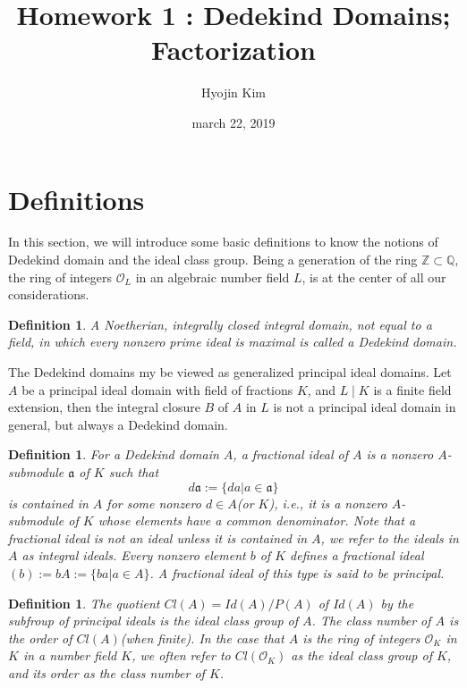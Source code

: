 \documentclass[11pt,a4paper,reqno]{amsart}
\numberwithin{equation}{section}
\newtheorem{defn}[thm]{Definition}
\begin{document}
 


\title{Homework 1 : Dedekind Domains; Factorization} 
\author{Hyojin Kim} 
\date{march 22, 2019} 
\maketitle 

\section{Definitions} 

In this section, we will introduce some basic definitions to know the notions of Dedekind domain and the ideal class group. 
Being a generation of the ring $\mathbb{Z} \subset \mathbb{Q}$, the ring of integers $\mathcal{O}_L$ in an algebraic number field $L$, is at the center of all our considerations.

\begin{defn}
A Noetherian, integrally closed integral domain, not equal to a field, in which every nonzero prime ideal is maximal is called a Dedekind domain.
\end{defn}

The Dedekind domains my be viewed as generalized principal ideal domains. 
Let $A$ be a principal ideal domain with field of fractions $K$, and $L \mid K$ is a finite field extension, 
then the integral closure $B$ of $A$ in $L$ is not a principal ideal domain in general,
but always a Dedekind domain.

\begin{defn}
For a Dedekind domain $A$, a fractional ideal of $A$ is a nonzero $A$-submodule $\mathfrak{a}$ of $K$ such that
\[
d\mathfrak{a}:= \{da|a\in \mathfrak{a} \}
\]
is contained in $A$ for some nonzero $d \in A$(or $K$),
i.e., it is a nonzero $A$-submodule of $K$ whose elements have a common denominator.
Note that a fractional ideal is not an ideal unless it is contained in $A$, 
we refer to the ideals in $A$ as integral ideals.
Every nonzero element $b$ of $K$ defines a fractional ideal $(b):=bA:=\{ba|a \in A \}$. 
A fractional ideal of this type is said to be principal.
\end{defn}


\begin{defn}
The quotient $Cl(A)=Id(A)/P(A)$ of $Id(A)$ by the subfroup of principal ideals is the ideal class group of $A$.
The class number of $A$ is the order of $Cl(A)$(when finite). 
In the case that $A$ is the ring of integers $\mathcal{O}_K$ in $K$ in a number field $K$, 
we often refer to $Cl({\mathcal{O}_K})$ as the ideal class group of $K$, and its order as the class number of $K$.
\end{defn}
\end{document}
